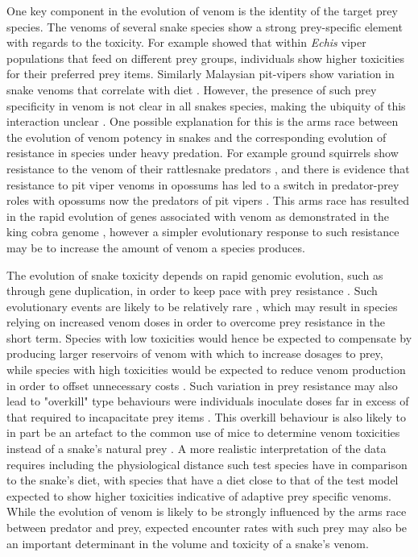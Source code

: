 One key component in the evolution of venom is the identity of the target prey species. The venoms of several snake species show a strong prey-specific element with regards to the toxicity. For example \cite{barlow2009coevolution} showed that within \textit{Echis} viper populations that feed on different prey groups, individuals show higher toxicities for their preferred prey items. Similarly Malaysian pit-vipers show variation in snake venoms that correlate with diet \citep{daltry1996diet}. However, the presence of such prey specificity in venom is not clear in all snakes species, making the ubiquity of this interaction unclear \citep{williams1988variation}. One possible explanation for this is the arms race between the evolution of venom potency in snakes and the corresponding evolution of resistance in species under heavy predation. For example ground squirrels show resistance to the venom of their rattlesnake predators \citep{poran1987resistance}, and there is evidence that resistance to pit viper venoms in opossums has led to a switch in predator-prey roles with opossums now the predators of pit vipers \citep{voss2013opossums}. This arms race has resulted in the rapid evolution of genes associated with venom as demonstrated in the king cobra genome \citep{vonk2013king}, however a simpler evolutionary response to such resistance may be to increase the amount of venom a species produces.


The evolution of snake toxicity depends on rapid genomic evolution, such as through gene duplication, in order to keep pace with prey resistance \citep{vonk2013king}. Such evolutionary events are likely to be relatively rare \citep{vonk2013king}, which may result in species relying on increased venom doses in order to overcome prey resistance in the short term. Species with low toxicities would hence be expected to compensate by producing larger reservoirs of venom with which to increase dosages to prey, while species with high toxicities would be expected to reduce venom production in order to offset unnecessary costs \citep{mccue2006cost}. Such variation in prey resistance may also lead to "overkill" type behaviours were individuals inoculate doses far in excess of that required to incapacitate prey items \citep{sasa1999diet,mebs2001toxicity}. This overkill behaviour is also likely to in part be an artefact to the common use of mice to determine venom toxicities instead of a snake's natural prey \citep{da2001prey}. A more realistic interpretation of the data requires including the physiological distance such test species have in comparison to the snake's diet, with species that have a diet close to that of the test model expected to show higher toxicities indicative of adaptive prey specific venoms. While the evolution of venom is likely to be strongly influenced by the arms race between predator and prey, expected encounter rates with such prey may also be an important determinant in the volume and toxicity of a snake's venom.


